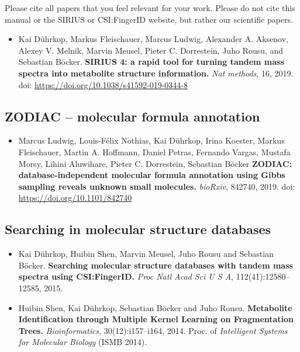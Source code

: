 \documentclass[letterpaper,10pt,openany,oneside]{sphinxmanual}
\begin{document}
Please cite all papers that you feel relevant for your work.  Please do not
cite this manual or the SIRIUS or CSI:FingerID website, but rather our
scientific papers.

\begin{itemize}
	\item Kai Dührkop, Markus Fleischauer, Marcus Ludwig, Alexander A. Aksenov, Alexey V. Melnik, Marvin Meusel, Pieter C. Dorrestein, Juho Rousu, and Sebastian Böcker.
	\textbf{SIRIUS 4: a rapid tool for turning tandem mass spectra into metabolite structure information.}
	\emph{Nat methods}, 16, 2019. doi: \url{https://doi.org/10.1038/s41592-019-0344-8}
\end{itemize}

\subsection*{ZODIAC -- molecular formula annotation}
\label{introduction:zodiac}
\begin{itemize}
	\item Marcus Ludwig, Louis-Félix Nothias, Kai Dührkop, Irina Koester, Markus Fleischauer, Martin A. Hoffmann, Daniel Petras, Fernando Vargas, Mustafa Morsy, Lihini Aluwihare, Pieter C. Dorrestein, Sebastian Böcker
	\textbf{ZODIAC: database-independent molecular formula annotation using Gibbs sampling reveals unknown small molecules.}
	\emph{bioRxiv}, 842740, 2019. doi: \url{https://doi.org/10.1101/842740}
\end{itemize}

\subsection*{Searching in molecular structure databases}
\label{introduction:searching-in-molecular-structure-databases}

\begin{itemize}
\item Kai Dührkop, Huibin Shen, Marvin Meusel, Juho Rousu and Sebastian Böcker.
\textbf{Searching molecular structure databases with tandem mass spectra using CSI:FingerID.}
\emph{Proc Natl Acad Sci U S A}, 112(41):12580--12585, 2015. 

\item Huibin Shen, Kai Dührkop, Sebastian Böcker and Juho Rousu.
\textbf{Metabolite Identification through Multiple Kernel Learning on Fragmentation Trees.}
\emph{Bioinformatics}, 30(12):i157--i164, 2014. Proc. of \emph{Intelligent Systems for Molecular Biology} (ISMB 2014).
\end{itemize}
\end{document}
